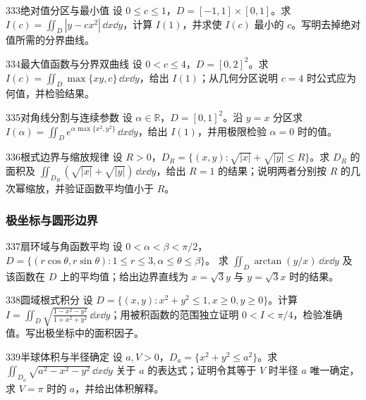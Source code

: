 \begin{exercise}{333}{绝对值分区与最小值}
设 $0\leq c\leq1$，$D=[-1,1]\times[0,1]$。求 $I(c)=\iint_D|y-cx^2|\,\dd x\dd y$，计算 $I(1)$，并求使 $I(c)$ 最小的 $c$。写明去掉绝对值所需的分界曲线。
\end{exercise}

\begin{exercise}{334}{最大值函数与分界双曲线}
设 $0<c\leq4$，$D=[0,2]^2$。求 $I(c)=\iint_D\max\{xy,c\}\,\dd x\dd y$，给出 $I(1)$；从几何分区说明 $c=4$ 时公式应为何值，并检验结果。
\end{exercise}

\begin{exercise}{335}{对角线分割与连续参数}
设 $\alpha\in\mathbb R$，$D=[0,1]^2$。沿 $y=x$ 分区求
$I(\alpha)=\iint_De^{\alpha\max\{x^2,y^2\}}\,\dd x\dd y$，给出 $I(1)$，并用极限检验 $\alpha=0$ 时的值。
\end{exercise}

\begin{exercise}{336}{根式边界与缩放规律}
设 $R>0$，$D_R=\{(x,y):\sqrt{|x|}+\sqrt{|y|}\leq R\}$。求 $D_R$ 的面积及
$\iint_{D_R}(\sqrt{|x|}+\sqrt{|y|})\,\dd x\dd y$，给出 $R=1$ 的结果；说明两者分别按 $R$ 的几次幂缩放，并验证函数平均值小于 $R$。
\end{exercise}

\subsubsection{极坐标与圆形边界}

\begin{exercise}{337}{扇环域与角函数平均}
设 $0<\alpha<\beta<\pi/2$，$D=\{(r\cos\theta,r\sin\theta):1\leq r\leq3,\alpha\leq\theta\leq\beta\}$。
求 $\iint_D\arctan(y/x)\,\dd x\dd y$ 及该函数在 $D$ 上的平均值；给出边界直线为 $x=\sqrt3y$ 与 $y=\sqrt3x$ 时的结果。
\end{exercise}

\begin{exercise}{338}{圆域根式积分}
设 $D=\{(x,y):x^2+y^2\leq1,x\geq0,y\geq0\}$。计算
$I=\iint_D\sqrt{\frac{1-x^2-y^2}{1+x^2+y^2}}\,\dd x\dd y$；用被积函数的范围独立证明 $0<I<\pi/4$，检验准确值。写出极坐标中的面积因子。
\end{exercise}

\begin{exercise}{339}{半球体积与半径确定}
设 $a,V>0$，$D_a=\{x^2+y^2\leq a^2\}$。求
$\iint_{D_a}\sqrt{a^2-x^2-y^2}\,\dd x\dd y$ 关于 $a$ 的表达式；证明令其等于 $V$ 时半径 $a$ 唯一确定，求 $V=\pi$ 时的 $a$，并给出体积解释。
\end{exercise}

